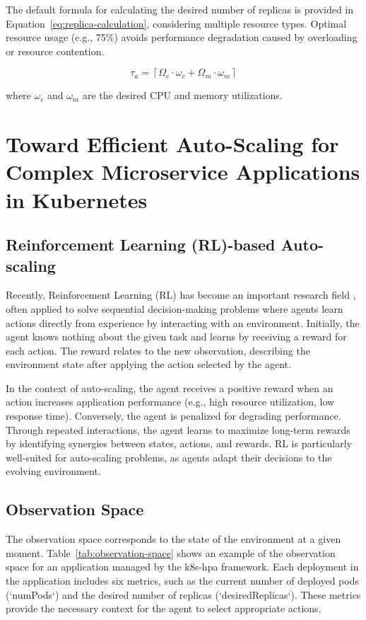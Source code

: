 \documentclass[conference]{IEEEtran}
\begin{document}
The default formula for calculating the desired number of replicas is provided in Equation~\ref{eq:replica-calculation}, considering multiple resource types. Optimal resource usage (e.g., 75\%) avoids performance degradation caused by overloading or resource contention.

\begin{equation}
    \tau_a = \left\lceil \Omega_c \cdot \omega_c + \Omega_m \cdot \omega_m \right\rceil
    \label{eq:replica-calculation}
\end{equation}

where $\omega_c$ and $\omega_m$ are the desired CPU and memory utilizations.

\section{Toward Efficient Auto-Scaling for Complex Microservice Applications in Kubernetes}
\label{sec:efficient_auto_scaling}

\subsection{Reinforcement Learning (RL)-based Auto-scaling}

Recently, Reinforcement Learning (RL) has become an important research field \cite{hessel2018rainbow}, often applied to solve sequential decision-making problems where agents learn actions directly from experience by interacting with an environment. Initially, the agent knows nothing about the given task and learns by receiving a reward for each action. The reward relates to the new observation, describing the environment state after applying the action selected by the agent.

In the context of auto-scaling, the agent receives a positive reward when an action increases application performance (e.g., high resource utilization, low response time). Conversely, the agent is penalized for degrading performance. Through repeated interactions, the agent learns to maximize long-term rewards by identifying synergies between states, actions, and rewards. RL is particularly well-suited for auto-scaling problems, as agents adapt their decisions to the evolving environment.

\subsection{Observation Space}

The observation space corresponds to the state of the environment at a given moment. Table~\ref{tab:observation-space} shows an example of the observation space for an application managed by the k8s-hpa framework. Each deployment in the application includes six metrics, such as the current number of deployed pods (`numPods`) and the desired number of replicas (`desiredReplicas`). These metrics provide the necessary context for the agent to select appropriate actions.
\end{document}
